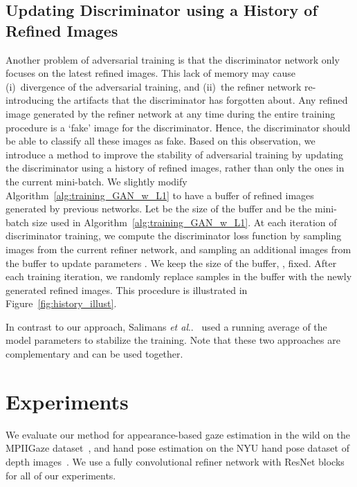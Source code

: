 \documentclass[10pt,twocolumn,letterpaper]{article}
\makeatletter
\DeclareRobustCommand\onedot{\futurelet\@let@token\@onedot}
\def\@onedot{\ifx\@let@token.\else.\null\fi\xspace}
\def\etal{\emph{et al}\onedot}
\makeatother
\begin{document}
\subsection{Updating Discriminator using a History of Refined Images}
Another problem of adversarial training is that the discriminator network only focuses on the latest refined images. 
This lack of memory may cause (i)~divergence of the adversarial training, and (ii)~the refiner network re-introducing the artifacts that the discriminator has forgotten about. 
Any refined image generated by the refiner network at any time during the entire training procedure is a `fake' image for the discriminator.
Hence, the discriminator should be able to classify all these images as fake.
Based on this observation, we introduce a method to improve the stability of adversarial training by updating the discriminator using a history of refined images, rather than only the ones in the current mini-batch.
We slightly modify Algorithm~\ref{alg:training_GAN_w_L1} to have a buffer of refined images generated by previous networks. 
Let  be the size of the buffer and  be the mini-batch size used in Algorithm~\ref{alg:training_GAN_w_L1}. 
At each iteration of discriminator training, we compute the discriminator loss function by sampling   images from the current refiner network, and sampling an additional  images from the buffer to update parameters . 
We keep the size of the buffer, , fixed. 
After each training iteration, we randomly replace  samples in the buffer with the newly generated refined images. 
This procedure is illustrated in Figure~\ref{fig:history_illust}.

In contrast to our approach, Salimans \etal~\cite{Salimans16} used  a running average of the model parameters to stabilize the training. 
Note that these two approaches are complementary and can be used together. 










\section{Experiments}

We evaluate our method for appearance-based gaze estimation in the wild on the MPIIGaze dataset~\cite{Wood16,Zhang15a}, and hand pose estimation on the NYU hand pose dataset of depth images~\cite{tompson14NYU}. 
We use a fully convolutional refiner network with ResNet blocks for all of our experiments.
\end{document}

